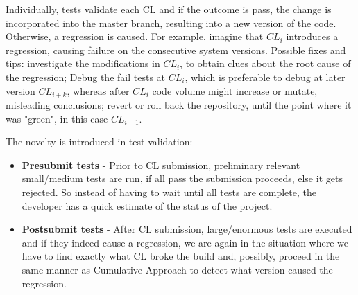 Individually, tests validate each CL and if the outcome is pass, the change is incorporated into the master branch, resulting into a new version of the code. Otherwise, a regression is caused. For example, imagine that $CL_i$ introduces a regression, causing failure on the consecutive system versions. Possible fixes and tips: investigate the modifications in $CL_i$, to obtain clues about the root cause of the regression; Debug the fail tests at $CL_i$, which is preferable to debug at later version $CL_{i+k}$, whereas after $CL_i$ code volume might increase or mutate, misleading conclusions; revert or roll back the repository, until the point where it was "green", in this case $CL_{i-1}$.\cite{Ziftci}


The novelty is introduced in test validation: 

\begin{itemize}
	\item \textbf{Presubmit tests} - Prior to CL submission, preliminary relevant small/medium tests are run, if all pass the submission proceeds, else it gets rejected. So instead of having to wait until all tests are complete, the developer has a quick estimate of the status of the project.
	\item \textbf{Postsubmit tests} - After CL submission, large/enormous tests are executed and if they indeed cause a regression, we are again in the situation where we have to find exactly what CL broke the build and, possibly, proceed in the same manner as Cumulative Approach to detect what version caused the regression. \cite{Ziftci}
\end{itemize}

